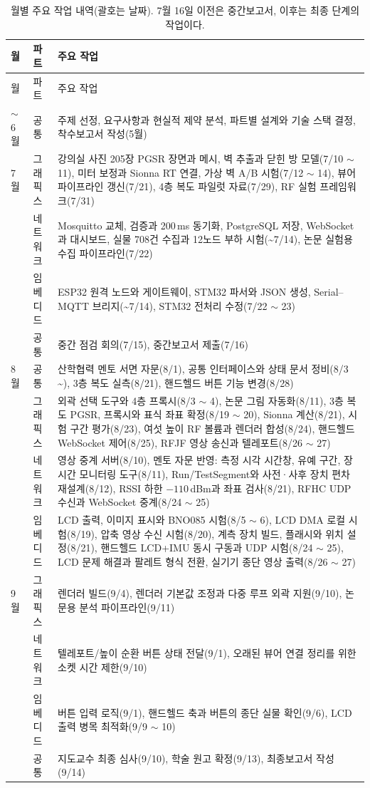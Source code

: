 \documentclass[11pt,a4paper]{article}
\begin{document}
{\small
\renewcommand{\arraystretch}{1.18}
\begin{longtable}{@{}>{\centering\arraybackslash}p{1.1cm}
  >{\raggedright\arraybackslash}p{1.6cm}
  >{\raggedright\arraybackslash}p{12.3cm}@{}}
\caption{월별 주요 작업 내역(괄호는 날짜). 7월 16일 이전은 중간보고서, 이후는 최종 단계의 작업이다.}\label{tab:monthly}\\
\toprule
월 & 파트 & 주요 작업 \\
\midrule
\endfirsthead
\toprule
월 & 파트 & 주요 작업 \\
\midrule
\endhead
\bottomrule
\endfoot
5 $\sim$ 6월 & 공통 & 주제 선정, 요구사항과 현실적 제약 분석, 파트별 설계와 기술 스택 결정, 착수보고서 작성(5월) \\
\midrule
7월 & 그래픽스 & 강의실 사진 205장 PGSR 장면과 메시, 벽 추출과 닫힌 방 모델(7/10 $\sim$ 11), 미터 보정과 Sionna RT 연결, 가상 벽 A/B 시험(7/12 $\sim$ 14), 뷰어 파이프라인 갱신(7/21), 4층 복도 파일럿 자료(7/29), RF 실험 프레임워크(7/31) \\
 & 네트워크 & Mosquitto 교체, 검증과 200\,ms 동기화, PostgreSQL 저장, WebSocket과 대시보드, 실물 708건 수집과 12노드 부하 시험(\textasciitilde 7/14), 논문 실험용 수집 파이프라인(7/22) \\
 & 임베디드 & ESP32 원격 노드와 게이트웨이, STM32 파서와 JSON 생성, Serial--MQTT 브리지(\textasciitilde 7/14), STM32 전처리 수정(7/22 $\sim$ 23) \\
 & 공통 & 중간 점검 회의(7/15), 중간보고서 제출(7/16) \\
\midrule
8월 & 공통 & 산학협력 멘토 서면 자문(8/1), 공통 인터페이스와 상태 문서 정비(8/3 \textasciitilde), 3층 복도 실측(8/21), 핸드헬드 버튼 기능 변경(8/28) \\
 & 그래픽스 & 외곽 선택 도구와 4층 프록시(8/3 $\sim$ 4), 논문 그림 자동화(8/11), 3층 복도 PGSR, 프록시와 표식 좌표 확정(8/19 $\sim$ 20), Sionna 계산(8/21), 시험 구간 평가(8/23), 여섯 높이 RF 볼륨과 렌더러 합성(8/24), 핸드헬드 WebSocket 제어(8/25), RFJF 영상 송신과 텔레포트(8/26 $\sim$ 27) \\
 & 네트워크 & 영상 중계 서버(8/10), 멘토 자문 반영: 측정 시각 시간창, 유예 구간, 장시간 모니터링 도구(8/11), Run/TestSegment와 사전·사후 장치 편차 재설계(8/12), RSSI 하한 $-110$\,dBm과 좌표 검사(8/21), RFHC UDP 수신과 WebSocket 중계(8/24 $\sim$ 25) \\
 & 임베디드 & LCD 출력, 이미지 표시와 BNO085 시험(8/5 $\sim$ 6), LCD DMA 로컬 시험(8/19), 압축 영상 수신 시험(8/20), 계측 장치 빌드, 플래시와 위치 설정(8/21), 핸드헬드 LCD+IMU 동시 구동과 UDP 시험(8/24 $\sim$ 25), LCD 문제 해결과 팔레트 형식 전환, 실기기 종단 영상 출력(8/26 $\sim$ 27) \\
\midrule
9월 & 그래픽스 & 렌더러 빌드(9/4), 렌더러 기본값 조정과 다중 루프 외곽 지원(9/10), 논문용 분석 파이프라인(9/11) \\
 & 네트워크 & 텔레포트/높이 순환 버튼 상태 전달(9/1), 오래된 뷰어 연결 정리를 위한 소켓 시간 제한(9/10) \\
 & 임베디드 & 버튼 입력 로직(9/1), 핸드헬드 축과 버튼의 종단 실물 확인(9/6), LCD 출력 병목 최적화(9/9 $\sim$ 10) \\
 & 공통 & 지도교수 최종 심사(9/10), 학술 원고 확정(9/13), 최종보고서 작성(9/14) \\
\end{longtable}
}
\end{document}
